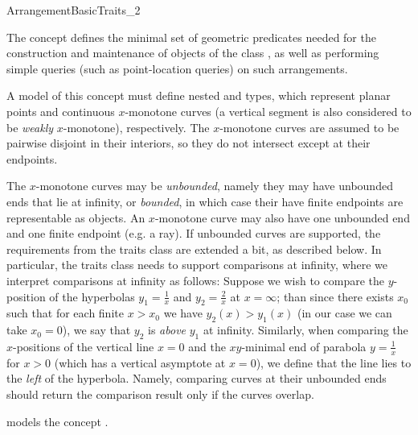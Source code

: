 
\ccRefPageBegin
\begin{ccRefConcept}{ArrangementBasicTraits_2}

\ccDefinition
The concept \ccRefName{} defines the minimal set of geometric
predicates needed for the construction and maintenance of objects of the
class , as well as performing simple queries (such as
point-location queries) on such arrangements.

A model of this concept must define nested  and
 types, which represent planar points and
continuous $x$-monotone curves (a vertical segment is also considered to be
{\sl weakly} $x$-monotone), respectively. The $x$-monotone curves are assumed
to be pairwise disjoint in their interiors, so they do not intersect
except at their endpoints.

The $x$-monotone curves may be {\em unbounded}, namely they may have unbounded
ends that lie at infinity, or {\em bounded}, in which case their have finite
endpoints are representable as  objects. An $x$-monotone curve
may also have one unbounded end and one finite endpoint (e.g. a ray).
If unbounded curves are supported, the requirements from the traits class
are extended a bit, as described below. In particular, the traits class needs
to support comparisons at infinity, where we interpret comparisons at infinity
as follows: Suppose we wish to compare the $y$-position of the hyperbolas
$y_1 = \frac{1}{x}$ and $y_2 = \frac{2}{x}$ at $x = \infty$; than since there
exists $x_0$ such that for each finite $x > x_0$ we have $y_2(x) > y_1(x)$
(in our case we can take $x_0 = 0$), we say that $y_2$ is {\em above} $y_1$ at
infinity. Similarly, when comparing the $x$-positions of the vertical line
$x = 0$ and the $xy$-minimal end of parabola $y = \frac{1}{x}$ for $x > 0$
(which has a vertical asymptote at $x = 0$), we define that the line lies to
the {\em left} of the hyperbola. Namely, comparing curves at their unbounded
ends should return the comparison result  only if the curves
overlap.


\ccTypes
\ccGlue
{}
  {models the concept .}


\end{ccRefConcept}
